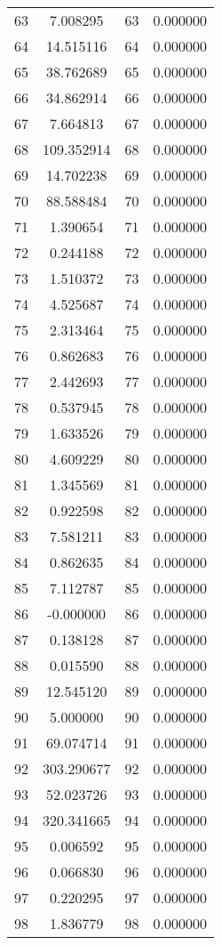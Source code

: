 \documentclass[12pt]{article}
\begin{document}
\begin{longtable}{@{}cccc@{}}
63 & 7.008295 & 63 & 0.000000 \\
64 & 14.515116 & 64 & 0.000000 \\
65 & 38.762689 & 65 & 0.000000 \\
66 & 34.862914 & 66 & 0.000000 \\
67 & 7.664813 & 67 & 0.000000 \\
68 & 109.352914 & 68 & 0.000000 \\
69 & 14.702238 & 69 & 0.000000 \\
70 & 88.588484 & 70 & 0.000000 \\
71 & 1.390654 & 71 & 0.000000 \\
72 & 0.244188 & 72 & 0.000000 \\
73 & 1.510372 & 73 & 0.000000 \\
74 & 4.525687 & 74 & 0.000000 \\
75 & 2.313464 & 75 & 0.000000 \\
76 & 0.862683 & 76 & 0.000000 \\
77 & 2.442693 & 77 & 0.000000 \\
78 & 0.537945 & 78 & 0.000000 \\
79 & 1.633526 & 79 & 0.000000 \\
80 & 4.609229 & 80 & 0.000000 \\
81 & 1.345569 & 81 & 0.000000 \\
82 & 0.922598 & 82 & 0.000000 \\
83 & 7.581211 & 83 & 0.000000 \\
84 & 0.862635 & 84 & 0.000000 \\
85 & 7.112787 & 85 & 0.000000 \\
86 & -0.000000 & 86 & 0.000000 \\
87 & 0.138128 & 87 & 0.000000 \\
88 & 0.015590 & 88 & 0.000000 \\
89 & 12.545120 & 89 & 0.000000 \\
90 & 5.000000 & 90 & 0.000000 \\
91 & 69.074714 & 91 & 0.000000 \\
92 & 303.290677 & 92 & 0.000000 \\
93 & 52.023726 & 93 & 0.000000 \\
94 & 320.341665 & 94 & 0.000000 \\
95 & 0.006592 & 95 & 0.000000 \\
96 & 0.066830 & 96 & 0.000000 \\
97 & 0.220295 & 97 & 0.000000 \\
98 & 1.836779 & 98 & 0.000000 \\

\end{longtable}
\end{document}
